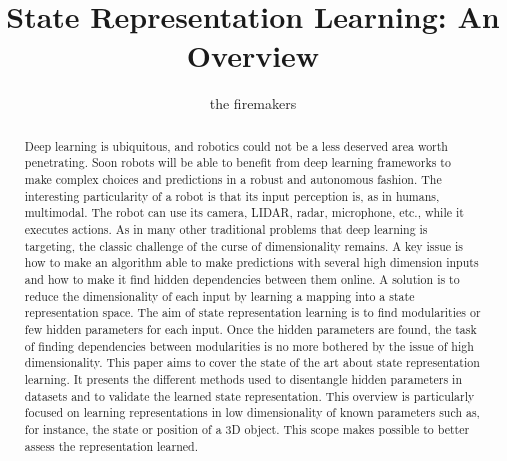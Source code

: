 \documentclass[a4paper]{article}
\title{State Representation Learning: An Overview}
\author{the firemakers}
\begin{document}
\maketitle

\begin{abstract}
Deep learning is ubiquitous, and robotics could not be a less deserved area worth penetrating. Soon robots will be able to benefit from deep learning frameworks to make complex choices and predictions in a robust and autonomous fashion. The interesting particularity of a robot is that its input perception is, as in humans, multimodal. The robot can use its camera,  LIDAR, radar, microphone, etc., while it executes actions. As in many other traditional problems that deep learning is targeting, the classic challenge of the curse of dimensionality remains. A key issue is how to make an algorithm able to make predictions with several high dimension inputs and how to make it find hidden dependencies between them online. A solution is to reduce the dimensionality of each input by learning a mapping into a state representation space. The aim of state representation learning is to find modularities or few hidden parameters for each input. Once the hidden parameters are found, the task of finding dependencies between modularities is no more bothered by the issue of high dimensionality. This paper aims to cover the state of the art about state representation learning. It presents the different methods used to disentangle hidden parameters in datasets and to validate the learned state representation. This overview is particularly focused on learning representations in low dimensionality of known parameters such as, for instance, the state or position of a 3D object. This scope makes possible to better assess the representation learned.
\end{abstract}
\end{document}
